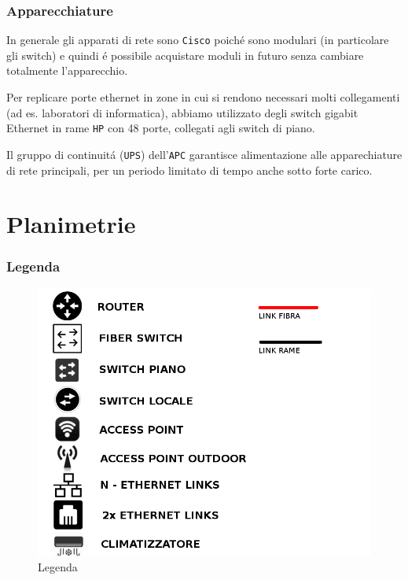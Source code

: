 \documentclass[11pt, a4paper, oneside]{article}
\begin{document}
		\section{Apparecchiature}
			\par
			In generale gli apparati di rete sono \texttt{Cisco} poich\'e sono modulari (in particolare gli switch) e quindi \'e possibile acquistare moduli in futuro senza cambiare totalmente l'apparecchio.
			\par
			Per replicare porte ethernet in zone in cui si rendono necessari molti collegamenti (ad es. laboratori di informatica), abbiamo utilizzato degli switch gigabit Ethernet in rame \texttt{HP} con 48 porte, collegati agli switch di piano.
			\par
			Il gruppo di continuit\'a (\texttt{UPS}) dell'\texttt{APC} garantisce alimentazione alle apparechiature di rete principali, per un periodo limitato di tempo anche sotto forte carico.
				
	\newpage
	\part{Planimetrie}
		\section{Legenda}
			\begin{figure}[H]
				\caption{Legenda}
				\includegraphics[scale=0.5]{legenda.png}
			\end{figure}
			\newpage
\end{document}
